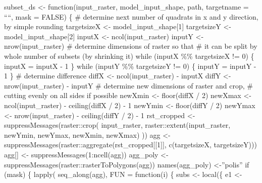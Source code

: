 \documentclass[
]{article}
\begin{document}
subset\_ds \textless- function(input\_raster, model\_input\_shape, path,
targetname = ````, mask = FALSE) \{ \# determine next number of quadrats
in x and y direction, by simple rounding targetsizeX \textless-
model\_input\_shape{[}1{]} targetsizeY \textless-
model\_input\_shape{[}2{]} inputX \textless- ncol(input\_raster) inputY
\textless- nrow(input\_raster) \# determine dimensions of raster so that
\# it can be split by whole number of subsets (by shrinking it) while
(inputX \%\% targetsizeX != 0) \{ inputX = inputX - 1 \} while (inputY
\%\% targetsizeY != 0) \{ inputY = inputY - 1 \} \# determine difference
diffX \textless- ncol(input\_raster) - inputX diffY \textless-
nrow(input\_raster) - inputY \# determine new dimensions of raster and
crop, \# cutting evenly on all sides if possible newXmin \textless-
floor(diffX / 2) newXmax \textless- ncol(input\_raster) - ceiling(diffX
/ 2) - 1 newYmin \textless- floor(diffY / 2) newYmax \textless-
nrow(input\_raster) - ceiling(diffY / 2) - 1 rst\_cropped \textless-
suppressMessages(raster::crop( input\_raster,
raster::extent(input\_raster, newYmin, newYmax, newXmin, newXmax) )) agg
\textless- suppressMessages(raster::aggregate(rst\_cropped{[}{[}1{]}{]},
c(targetsizeX, targetsizeY))) agg{[}{]} \textless-
suppressMessages(1:ncell(agg)) agg\_poly \textless-
suppressMessages(raster::rasterToPolygons(agg)) names(agg\_poly)
\textless-''polis'' if (mask) \{ lapply( seq\_along(agg), FUN =
function(i) \{ subs \textless- local(\{ e1 \textless-
\end{document}
